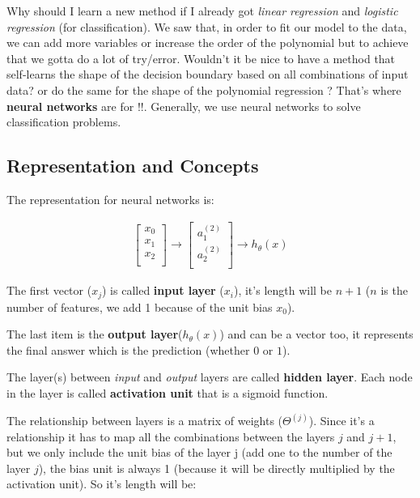 Why should I learn a new method if I already got \textit{linear regression} and \textit{logistic regression} (for classification). We saw that, in order to fit our model to the data, we can add more variables or increase the order of the polynomial but to achieve that we gotta do a lot of try/error. Wouldn't it be nice to have a method that self-learns the shape of the decision boundary based on all combinations of input data? or do the same for the shape of the polynomial regression ? That's where \textbf{neural networks} are for !!. Generally, we use neural networks to solve classification problems.

\subsection{Representation and Concepts}

The representation for neural networks is:

\begin{align}
	\begin{bmatrix}
		x_0 \\
		x_1 \\
		x_2 \\
	\end{bmatrix}
	\rightarrow
	\begin{bmatrix}
		a_1^{(2)} \\
		a_2^{(2)} \\
	\end{bmatrix}
	\rightarrow
	h_{\theta}(x) \label{neural-network-rep}
\end{align}

The first vector ($x_j$) is called \textbf{input layer} ($x_i$), it's length will be $n + 1$ ($n$ is the number of features, we add 1 because of the unit bias $x_0$). 

The last item is the \textbf{output layer}($h_{\theta}(x)$) and can be a vector too, it represents the final answer which is the prediction (whether $0$ or $1$).

The layer(s) between \textit{input} and \textit{output} layers are called \textbf{hidden layer}. Each node in the layer is called \textbf{activation unit} that is a sigmoid function.

The relationship between layers is a matrix of weights ($\Theta^{(j)}$). Since it's a relationship it has to map all the combinations between the layers $j$ and $j + 1$, but we only include the unit bias of the layer j (add one to the number of the layer $j$), the bias unit is always 1 (because it will be directly multiplied by the activation unit). So it's length will be:

